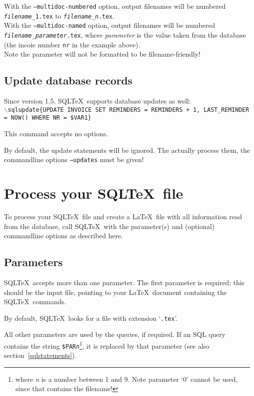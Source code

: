 \documentclass{article}
\newcommand{\bs}{\ensuremath{\backslash}}
\newcommand{\vs}{\vspace{3mm}}
\begin{document}
\vs

With the \texttt{--multidoc-numbered} option, output filenames will be numbered \texttt{\emph{filename}\_1.tex} to \texttt{\emph{filename}\_\emph{n}.tex}.\\
With the \texttt{--multidoc-named} option, output filenames will be numbered \texttt{\emph{filename}\_\emph{parameter}.tex}, where \emph{parameter} is the value taken from the database (the incoie number \texttt{nr} in the example above). \\
Note the parameter will not be formatted to be filename-friendly!\\

\subsection{Update database records}

Since version 1.5, SQL\TeX\ supports database updates as well: \\
\texttt{\bs sqlupdate\{UPDATE INVOICE SET REMINDERS = REMINDERS + 1,
LAST\_REMINDER = NOW() WHERE NR = \$VAR1\}}

This command accepts no options.

\vs

By default, the update statements will be ignored. The actually process them, the commandline options \texttt{--updates} must be given!

\section{Process your SQL\TeX\ file}

To process your SQL\TeX\ file and create a \LaTeX\ file with all information read from
the database, call SQL\TeX\ with the parameter(s) and (optional) command\-line options as
described here.

\subsection{Parameters}\label{params}

SQL\TeX\ accepts more than one parameter. The first parameter is required; this should
be the input file, pointing to your \LaTeX\ document containing the SQL\TeX\ commands.

By default, SQL\TeX\ looks for a file with extension `\texttt{.tex}'.

\vs

All other parameters are used by the queries, if required. If an SQL query contains the
string \texttt{\$PAR\textit{n}}\footnote{where \textit{n} is a number between 1 and 9. Note 
parameter `0' cannot be used, since that contains the filename!}, it is replaced by that parameter
(see also section~\ref{sqlstatements}).
\end{document}
